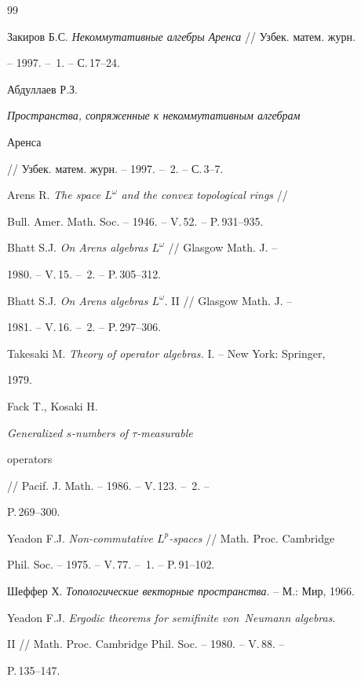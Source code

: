 \begin{thebibliography}{99} 


 




Закиров Б.С. {\em Некоммутативные алгебры Аренса} // Узбек. матем. журн. 


-- 1997. -- \No\,1. -- С.\,17--24. 




Абдуллаев Р.З. {\em Пространства, сопряженные к некоммутативным алгебрам 


Аренса} // Узбек. матем. журн. -- 1997. -- \No\,2. -- С.\,3--7. 




Arens R. {\em The space $L^\omega$ and the convex topological rings} // 


Bull. Amer. Math. Soc. -- 1946. -- V.\,52. -- P.\,931--935. 




Bhatt S.J. {\em On Arens algebras $L^\omega$} // Glasgow Math. J. -- 


1980. -- V.\,15. -- \No\,2. -- P.\,305--312. 




Bhatt S.J. {\em On Arens algebras $L^\omega$}. II // Glasgow Math. J. -- 


1981. -- V.\,16. -- \No\,2. -- P.\,297--306. 




Takesaki M. {\em Theory of operator algebras.} I. -- New York: Springer, 


1979. 




Fack T., Kosaki H. {\em Generalized $s$-numbers of $\tau$-measurable 


operators} // Pacif. J. Math. -- 1986. -- V.\,123. -- \No\,2. -- 


P.\,269--300. 




Yeadon F.J. {\em Non-commutative $L^p$-spaces} // Math. Proc. Cambridge 


Phil. Soc. -- 1975. -- V.\,77. -- \No\,1. -- P.\,91--102. 




Шеффер Х. {\em Топологические векторные пространства}. -- М.: Мир, 1966. 




Yeadon F.J. {\em Ergodic theorems for semifinite von~Neumann algebras}. 


II // Math. Proc. Cambridge Phil. Soc. -- 1980. -- V.\,88. -- 


P.\,135--147. 


 


\end{thebibliography} 


 


\vskip 2cm 


 






 


\label{end} 


 


